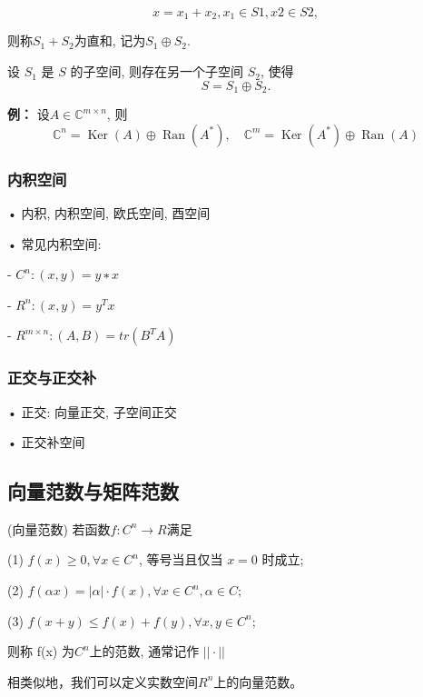 \documentclass[12pt,a4paper]{article}
\begin{document}
$$x = x_1 + x_2, x_1 ∈ S1, x2 ∈ S2,$$

则称$S_1 + S_2$为直和, 记为$S_1 ⊕ S_2$.

\begin{framed}
	\begin{theorem}
		
		设 $S_1$ 是 $S$ 的子空间, 则存在另一个子空间 $S_2$, 使得$$S = S_1 ⊕ S_2.$$
		
	\end{theorem}
\end{framed}

\begin{framed}
		
		{\bfseries 例：} \quad 设$A ∈\mathbb{C}^{m×n}$, 则
		$$\mathbb{C}^{n}=\operatorname{Ker}(A) \oplus \operatorname{Ran}\left(A^{*}\right), \quad \mathbb{C}^{m}=\operatorname{Ker}\left(A^{*}\right) \oplus \operatorname{Ran}(A)$$ 
		
\end{framed}

\subsubsection{内积空间}
• 内积, 内积空间, 欧氏空间, 酉空间

• 常见内积空间:

\qquad - $C^{n} : (x, y) = y∗x$

\qquad - $R^{n} : (x, y) = y^{T}x$

\qquad - $R^{m×n} : (A, B) = tr(B^{T}A)$

\subsubsection{正交与正交补}

• 正交: 向量正交, 子空间正交

• 正交补空间

\subsection{向量范数与矩阵范数}
\begin{framed}
\begin{definition}(向量范数)
	若函数$f : C^n → R $满足
	
	(1) $f(x) ≥ 0, ∀ x ∈ C^n$, 等号当且仅当 $x = 0$ 时成立;
	
	(2) $f(αx) = |α| · f(x), ∀ x ∈ C^{n}, α ∈ C;$
	
	(3) $f(x + y) ≤ f(x) + f(y), ∀x, y ∈ C^{n};$
	
	则称 f(x) 为$C^{n}$上的范数, 通常记作 $||·||$
\end{definition}
\end{framed}
相类似地，我们可以定义实数空间$R^n$上的向量范数。
\end{document}
